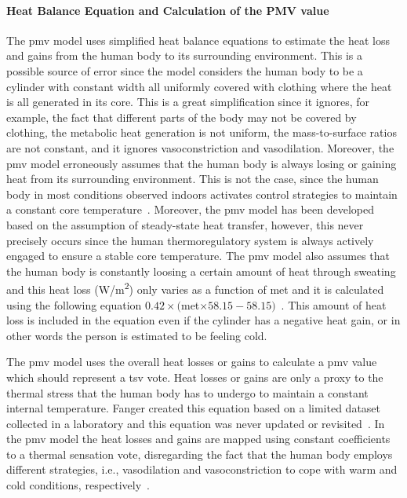\paragraph{Heat Balance Equation and Calculation of the PMV value}
The \ac{pmv} model uses simplified heat balance equations to estimate the heat loss and gains from the human body to its surrounding environment.
This is a possible source of error since the model considers the human body to be a cylinder with constant width all uniformly covered with clothing where the heat is all generated in its core.
This is a great simplification since it ignores, for example, the fact that different parts of the body may not be covered by clothing, the metabolic heat generation is not uniform, the mass-to-surface ratios are not constant, and it ignores vasoconstriction and vasodilation.
Moreover, the \ac{pmv} model erroneously assumes that the human body is always losing or gaining heat from its surrounding environment.
This is not the case, since the human body in most conditions observed indoors activates control strategies to maintain a constant core temperature~\cite{romanovsky_thermoregulation_2018}.
Moreover, the \ac{pmv} model has been developed based on the assumption of steady-state heat transfer, however, this never precisely occurs since the human thermoregulatory system is always actively engaged to ensure a stable core temperature.
The \ac{pmv} model also assumes that the human body is constantly loosing a certain amount of heat through sweating and this heat loss (W/m\textsuperscript{2}) only varies as a function of \ac{met} and it is calculated using the following equation $0.42\times($\ac{met}$\times58.15 - 58.15)$~\cite{Fanger1970}.
This amount of heat loss is included in the equation even if the cylinder has a negative heat gain, or in other words the person is estimated to be feeling cold.

The \ac{pmv} model uses the overall heat losses or gains to calculate a \ac{pmv} value which should represent a \ac{tsv} vote.
Heat losses or gains are only a proxy to the thermal stress that the human body has to undergo to maintain a constant internal temperature.
Fanger created this equation based on a limited dataset collected in a laboratory and this equation was never updated or revisited~\cite{Fanger1970}.
In the \ac{pmv} model the heat losses and gains are mapped using constant coefficients to a thermal sensation vote, disregarding the fact that the human body employs different strategies, i.e., vasodilation and vasoconstriction to cope with warm and cold conditions, respectively~\cite{romanovsky_thermoregulation_2018}.

